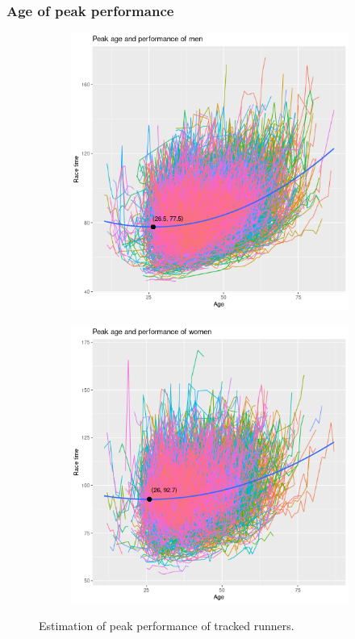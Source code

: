 \documentclass[12pt]{article}
\begin{document}
\subsubsection*{Age of peak performance}

\begin{figure}[ht]
	\centering
	\begin{subfigure}{0.49\textwidth}
		\includegraphics[width = \textwidth]
		{../figure/peak_plot2-1.png}
		\caption{}
		\label{peak-men}
	\end{subfigure}
	\hfill
	\begin{subfigure}{0.49\textwidth}
		\includegraphics[width = \textwidth]
		{../figure/peak_plot2-2.png}
		\caption{}
		\label{peak-women}
	\end{subfigure}
	\caption{
		Estimation of peak performance of tracked runners.
	}
	\label{peak}
\end{figure}
\end{document}
